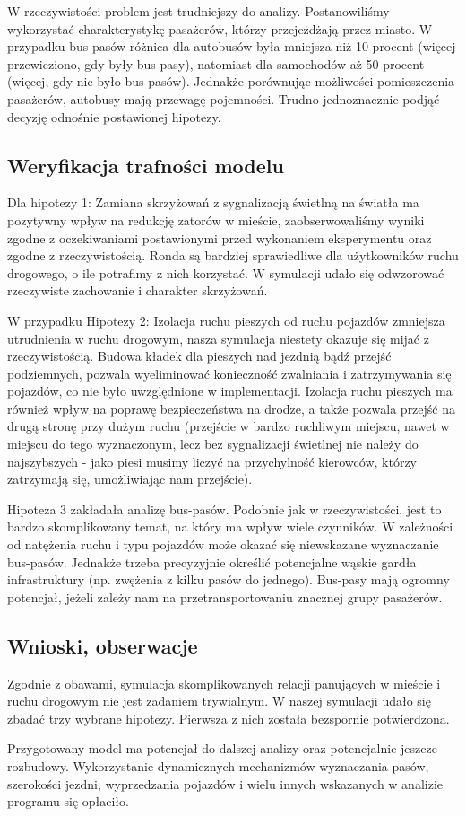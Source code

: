 \documentclass{article}
\begin{document}
W rzeczywistości problem jest trudniejszy do analizy. Postanowiliśmy wykorzystać charakterystykę pasażerów, którzy przejeżdżają przez miasto. W przypadku bus-pasów różnica dla autobusów była mniejsza niż 10 procent (więcej przewieziono, gdy były bus-pasy), natomiast dla samochodów aż 50 procent (więcej, gdy nie było bus-pasów). Jednakże porównując możliwości pomieszczenia pasażerów, autobusy mają przewagę pojemności. Trudno jednoznacznie podjąć decyzję odnośnie postawionej hipotezy.

\subsection{Weryfikacja trafności modelu}
\label{subsection:weryfikacja-trafnosci-modelu}
Dla hipotezy 1: Zamiana skrzyżowań z sygnalizacją świetlną na światła ma pozytywny wpływ na redukcję zatorów w mieście, zaobserwowaliśmy wyniki zgodne z oczekiwaniami postawionymi przed wykonaniem eksperymentu oraz zgodne z rzeczywistością. Ronda są bardziej sprawiedliwe dla użytkowników ruchu drogowego, o ile potrafimy z nich korzystać. W symulacji udało się odwzorować rzeczywiste zachowanie i charakter skrzyżowań.

W przypadku Hipotezy 2: Izolacja ruchu pieszych od ruchu pojazdów zmniejsza utrudnienia w ruchu drogowym, nasza symulacja niestety okazuje się mijać z rzeczywistością. Budowa kładek dla pieszych nad jezdnią bądź przejść podziemnych, pozwala wyeliminować konieczność zwalniania i zatrzymywania się pojazdów, co nie było uwzględnione w implementacji. Izolacja ruchu pieszych ma również wpływ na poprawę bezpieczeństwa na drodze, a także pozwala przejść na drugą stronę przy dużym ruchu (przejście w bardzo ruchliwym miejscu, nawet w miejscu do tego wyznaczonym, lecz bez sygnalizacji świetlnej nie należy do najszybszych - jako piesi musimy liczyć na przychylność kierowców, którzy zatrzymają się, umożliwiając nam przejście).

Hipoteza 3 zakładała analizę bus-pasów. Podobnie jak w rzeczywistości, jest to bardzo skomplikowany temat, na który ma wpływ wiele czynników. W zależności od natężenia ruchu i typu pojazdów może okazać się niewskazane wyznaczanie bus-pasów. Jednakże trzeba precyzyjnie określić potencjalne wąskie gardła infrastruktury (np. zwężenia z kilku pasów do jednego). Bus-pasy mają ogromny potencjał, jeżeli zależy nam na przetransportowaniu znacznej grupy pasażerów.

\subsection{Wnioski, obserwacje}
\label{subsection:wnioski}
Zgodnie z obawami, symulacja skomplikowanych relacji panujących w mieście i ruchu drogowym nie jest zadaniem trywialnym. W naszej symulacji udało się zbadać trzy wybrane hipotezy. Pierwsza z nich została bezspornie potwierdzona.

Przygotowany model ma potencjał do dalszej analizy oraz potencjalnie jeszcze rozbudowy. Wykorzystanie dynamicznych mechanizmów wyznaczania pasów, szerokości jezdni, wyprzedzania pojazdów i wielu innych wskazanych w analizie programu się opłaciło.
\end{document}
